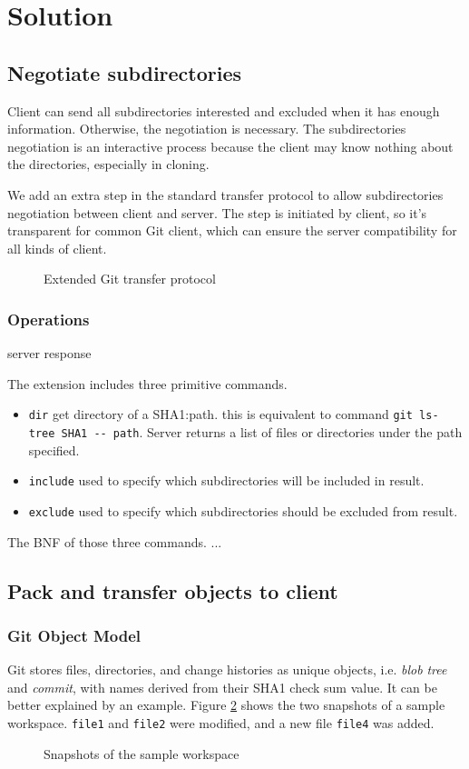 \documentclass[preprint]{sigplanconf}
\begin{document}
\section{Solution}
\subsection{Negotiate subdirectories}
Client can send all subdirectories interested and excluded when it has enough information.
Otherwise, the negotiation is necessary.
The subdirectories negotiation is an interactive process because the client may know nothing about the directories, especially in cloning.

We add an extra step in the standard transfer protocol to allow subdirectories negotiation between client and server.
The step is initiated by client, so it's transparent for common Git client, which can ensure the server compatibility for all kinds of client.
\begin{figure}
  \centering
  
  \caption{Extended Git transfer protocol}
  \label{fig:git-proto-ext-seq}
\end{figure}
\subsubsection{Operations}
server response


The extension includes three primitive commands.
\begin{itemize}
  \item \verb|dir| get directory of a SHA1:path.
    this is equivalent to command \verb|git ls-tree SHA1 -- path|.
    Server returns a list of files or directories under the path specified.
  \item \verb|include| used to specify which subdirectories will be included in result.
  \item \verb|exclude| used to specify which subdirectories should be excluded from result.
\end{itemize}

The BNF of those three commands.
...

\subsection{Pack and transfer objects to client}
\subsubsection{Git Object Model}
Git stores files, directories, and change histories as unique objects, i.e. \emph{blob} \emph{tree} and \emph{commit}, with names derived from their SHA1 check sum value\cite{gitobj}.
It can be better explained by an example.
Figure \ref{fig:workspace} shows the two snapshots of a sample workspace.
\verb|file1| and \verb|file2| were modified, and a new file \verb|file4| was added.
\begin{figure}
  \centering
  
  \caption{Snapshots of the sample workspace}
  \label{fig:workspace}
\end{figure}
\end{document}
